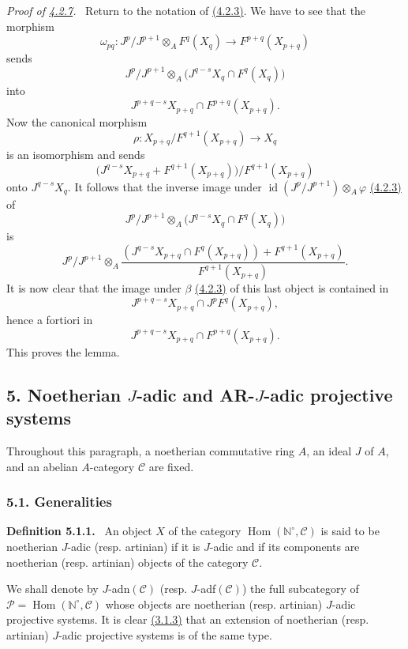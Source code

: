 \documentclass[11pt]{article}
\newenvironment{statement}[1]{\par\medskip\noindent\textbf{#1.}\ }{\par\medskip}
\newenvironment{prooftext}[1][Proof]{\par\noindent\emph{#1.}\ }{\par\medskip}
\DeclareMathOperator{\Hom}{Hom}
\providecommand{\id}{\operatorname{id}}
\providecommand{\Hom}{\operatorname{Hom}}
\providecommand{\id}{\operatorname{id}}
\providecommand{\id}{\operatorname{id}}
\providecommand{\id}{\operatorname{id}}
\providecommand{\id}{\operatorname{id}}
\providecommand{\Hom}{\operatorname{Hom}}
\providecommand{\id}{\operatorname{id}}
\begin{document}
\begin{prooftext}[{Proof of \hyperref[sga5:V:lemma:4.2.7]{4.2.7}}]
Return to the notation of \hyperref[sga5:V:subsubsection:4.2.3]{(4.2.3)}. We have to see that the morphism
\[
\omega_{pq}:J^p/J^{p+1}\otimes_A F^q(X_q)\longrightarrow F^{p+q}(X_{p+q})
\]
sends
\[
J^p/J^{p+1}\otimes_A
\bigl(J^{q-s}X_q\cap F^q(X_q)\bigr)
\]
into
\[
J^{p+q-s}X_{p+q}\cap F^{p+q}(X_{p+q}).
\]
Now the canonical morphism
\[
\rho:X_{p+q}/F^{q+1}(X_{p+q})\longrightarrow X_q
\]
is an isomorphism and sends
\[
\bigl(J^{q-s}X_{p+q}+F^{q+1}(X_{p+q})\bigr)/F^{q+1}(X_{p+q})
\]
onto \(J^{q-s}X_q\). It follows that the inverse image under
\(\id(J^p/J^{p+1})\otimes_A\varphi\) \hyperref[sga5:V:subsubsection:4.2.3]{(4.2.3)} of
\[
J^p/J^{p+1}\otimes_A
\bigl(J^{q-s}X_q\cap F^q(X_q)\bigr)
\]
is
\[
J^p/J^{p+1}\otimes_A
\frac{(J^{q-s}X_{p+q}\cap F^q(X_{p+q}))+F^{q+1}(X_{p+q})}
     {F^{q+1}(X_{p+q})}.
\]
It is now clear that the image under \(\beta\) \hyperref[sga5:V:subsubsection:4.2.3]{(4.2.3)} of this last object is contained in
\[
J^{p+q-s}X_{p+q}\cap J^pF^q(X_{p+q}),
\]
hence a fortiori in
\[
J^{p+q-s}X_{p+q}\cap F^{p+q}(X_{p+q}).
\]
This proves the lemma.
\end{prooftext}

\subsection*{5. Noetherian \(J\)-adic and AR-\(J\)-adic projective systems}\label{sga5:V:subsection:5}

Throughout this paragraph, a noetherian commutative ring \(A\), an ideal \(J\) of \(A\), and an abelian \(A\)-category \(\mathcal C\) are fixed.

\subsubsection*{5.1. Generalities}\label{sga5:V:subsubsection:5.1}

\label{sga5:V:definition:5.1.1}\begin{statement}{Definition 5.1.1}
An object \(X\) of the category \(\Hom(\mathbb N^\circ,\mathcal C)\) is said to be noetherian \(J\)-adic (resp. artinian) if it is \(J\)-adic and if its components are noetherian (resp. artinian) objects of the category \(\mathcal C\).
\end{statement}

We shall denote by \(J\)-adn\((\mathcal C)\) (resp. \(J\)-adf\((\mathcal C)\)) the full subcategory of
\(\mathcal P=\Hom(\mathbb N^\circ,\mathcal C)\) whose objects are noetherian (resp. artinian) \(J\)-adic projective systems. It is clear \hyperref[sga5:V:proposition:3.1.3]{(3.1.3)} that an extension of noetherian (resp. artinian) \(J\)-adic projective systems is of the same type.
\end{document}
